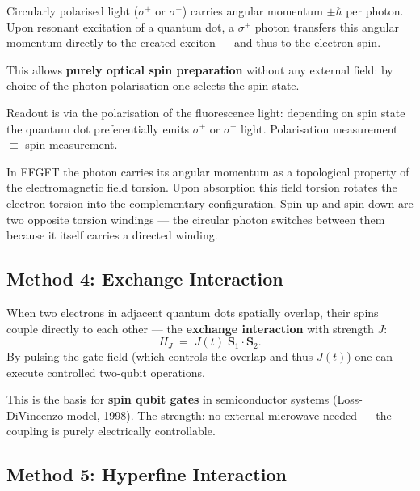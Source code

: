 Circularly polarised light ($\sigma^+$ or $\sigma^-$)
carries angular momentum $\pm\hbar$ per photon.
Upon resonant excitation of a quantum dot,
a $\sigma^+$ photon transfers this angular momentum directly to
the created exciton --- and thus to the electron spin.

This allows \textbf{purely optical spin preparation}
without any external field: by choice of the photon polarisation
one selects the spin state.

Readout is via the polarisation of the
fluorescence light: depending on spin state the
quantum dot preferentially emits $\sigma^+$ or $\sigma^-$ light.
Polarisation measurement $\equiv$ spin measurement.

\begin{foundation}
In FFGFT the photon carries its angular momentum as a
topological property of the electromagnetic
field torsion. Upon absorption this
field torsion rotates the electron torsion into the
complementary configuration.
Spin-up and spin-down are two opposite
torsion windings --- the circular photon
switches between them because it itself
carries a directed winding.
\end{foundation}

\subsection{Method 4: Exchange Interaction}
\label{sec:exchange}

When two electrons in adjacent quantum dots
spatially overlap, their spins couple directly
to each other --- the \textbf{exchange interaction}
with strength $J$:
\begin{equation}
  H_J \;=\; J(t)\;\mathbf{S}_1 \cdot \mathbf{S}_2.
\end{equation}
By pulsing the gate field (which controls the overlap and
thus $J(t)$) one can execute controlled
two-qubit operations.

This is the basis for \textbf{spin qubit gates}
in semiconductor systems (Loss-DiVincenzo model, 1998).
The strength: no external microwave needed ---
the coupling is purely electrically controllable.

\subsection{Method 5: Hyperfine Interaction}
\label{sec:hyperfine}


